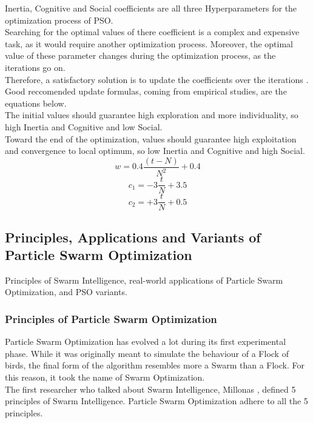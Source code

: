Inertia, Cognitive and Social coefficients are all three Hyperparameters for the optimization process of PSO.
\\[0.3cm]Searching for the optimal values of there coefficient is a complex and expensive task, as it would require another optimization process.
Moreover, the optimal value of these parameter changes during the optimization process, as the iterations go on.
\\[0.3cm]Therefore, a satisfactory solution is to update the coefficients over the iterations \cite{Tesi-3.2}.
Good reccomended update formulas, coming from empirical studies, are the equations below.
\\[0.3cm]The initial values should guarantee high exploration and more individuality, so high Inertia and Cognitive and low Social.
\\[0.3cm]Toward the end of the optimization, values should guarantee high exploitation and convergence to local optimum, so low Inertia and Cognitive and high Social.
\begin{equation}
	w = 0.4\frac{(t-N)}{N^2} + 0.4
\end{equation}
\begin{equation}
	c_1 = -3\frac{t}{N} + 3.5
\end{equation}
\begin{equation}
	c_2 = +3\frac{t}{N} + 0.5
\end{equation}

\subsection{Principles, Applications and Variants of Particle Swarm Optimization}

Principles of Swarm Intelligence, real-world applications of Particle Swarm Optimization, and PSO variants.

\subsubsection{Principles of Particle Swarm Optimization}

Particle Swarm Optimization has evolved a lot during its first experimental phase.
While it was originally meant to simulate the behaviour of a Flock of birds, the final form of the algorithm resembles more a Swarm than a Flock. For this reason, it took the name of Swarm Optimization.
\\[0.3cm]The first researcher who talked about Swarm Intelligence, Millonas \cite{SwarmIntelligence}, defined 5 principles of Swarm Intelligence.
Particle Swarm Optimization adhere to all the 5 principles.

